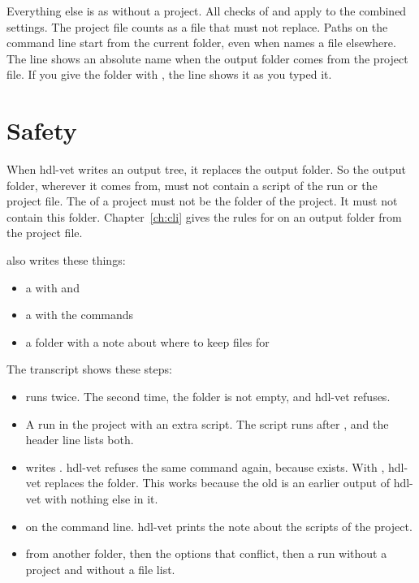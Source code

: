 Everything else is as without a project. All checks of  and
 apply to the combined settings. The project file counts as a file that
 must not replace. Paths on the command line start from the current
folder, even when  names a file elsewhere. The  line shows
an absolute name when the output folder comes from the project file. If you give the
folder with , the line shows it as you typed it.

\section{Safety}

When hdl-vet writes an output tree, it replaces the output folder. So the output folder,
wherever it comes from, must not contain a script of the run or the project file. The
 of a project must not be the folder of the project. It must not contain
this folder. Chapter~\ref{ch:cli} gives the rules for  on an output folder
from the project file.

 also writes these things:

\begin{itemize}
\item a  with  and 
\item a  with the commands
\item a  folder with a note about where to keep files for
\end{itemize}



The transcript shows these steps:

\begin{itemize}
\item {} runs twice. The second time, the folder is not empty, and hdl-vet
  refuses.
\item A run in the project with an extra script. The script  runs
  after , and the header line lists both.
\item {} writes . hdl-vet refuses the same command again, because
   exists. With , hdl-vet replaces the folder. This works because
  the old  is an earlier output of hdl-vet with nothing else in it.
\item {} on the command line. hdl-vet prints the note about the scripts of the
  project.
\item {} from another folder, then the options that conflict, then a run
  without a project and without a file list.
\end{itemize}

